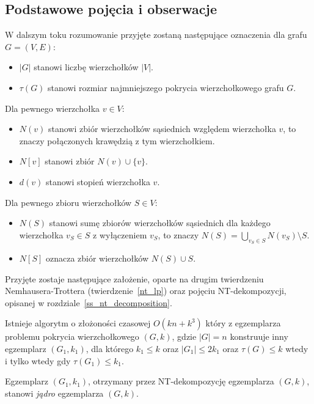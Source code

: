 \subsection{Podstawowe pojęcia i obserwacje}\label{ss_ckx_preliminaries}
\par{
  W dalszym toku rozumowanie przyjęte zostaną następujące oznaczenia dla grafu $G=(V, E)$:
  \begin{itemize}
    \item $|G|$ stanowi liczbę wierzchołków $|V|$.
    \item $\tau(G)$ stanowi rozmiar najmniejszego pokrycia wierzchołkowego grafu $G$.
  \end{itemize}
  Dla pewnego wierzchołka $v \in V$:
  \begin{itemize}
    \item $N(v)$ stanowi zbiór wierzchołków sąsiednich względem wierzchołka $v$, to znaczy połączonych krawędzią z tym wierzchołkiem.
    \item $N[v]$ stanowi zbiór $N(v) \cup \{v\}$.
    \item $d(v)$ stanowi stopień wierzchołka $v$.
  \end{itemize}
  Dla pewnego zbioru wierzchołków $S \in V$:
  \begin{itemize}
    \item $N(S)$ stanowi sumę zbiorów wierzchołków sąsiednich dla każdego wierzchołka $v_S \in S$ z wyłączeniem $v_S$, to znaczy $N(S)=\bigcup_{v_S\in S}N(v_S) \setminus S$.
    \item $N[S]$ oznacza zbiór wierzchołków $N(S) \cup S$.
  \end{itemize}

  Przyjęte zostaje następujące założenie, oparte na drugim twierdzeniu Nemhausera-Trottera (twierdzenie~\ref{nt_lp}) oraz pojęciu NT-dekompozycji, opisanej w rozdziale~\ref{ss_nt_decomposition}.
  \begin{proposition}
    Istnieje algorytm o złożoności czasowej $O(kn + k^3)$ który z egzemplarza problemu pokrycia wierzchołkowego $(G, k)$, gdzie $|G|=n$ konstruuje inny egzemplarz $(G_1, k_1)$, dla którego $k_1 \leq k$ oraz $|G_1| \leq 2k_1$ oraz $\tau(G) \leq k$ wtedy i tylko wtedy gdy $\tau(G_1) \leq k_1$.
  \end{proposition}

  \begin{definition}
    Egzemplarz $(G_1, k_1)$, otrzymany przez NT-dekompozycję egzemplarza $(G, k)$, stanowi \emph{jądro} egzemplarza $(G, k)$.
  \end{definition}
}
